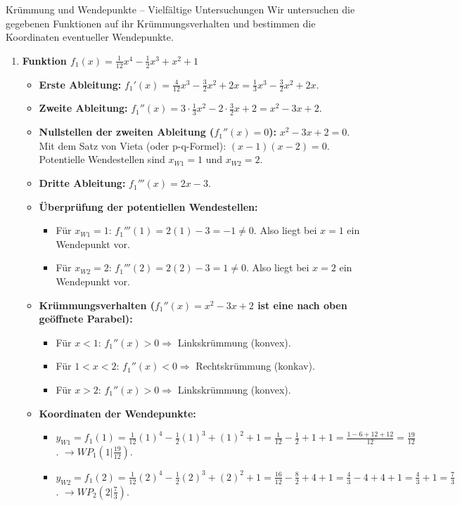 \begin{loesungsumgebung}{Krümmung und Wendepunkte – Vielfältige Untersuchungen}
Wir untersuchen die gegebenen Funktionen auf ihr Krümmungsverhalten und bestimmen die Koordinaten eventueller Wendepunkte.

\begin{enumerate}[label=(\alph*)]
    \item \textbf{Funktion $f_1(x) = \frac{1}{12}x^4 - \frac{1}{2}x^3 + x^2 + 1$}
    \begin{itemize}
        \item \textbf{Erste Ableitung:} $f_1'(x) = \frac{4}{12}x^3 - \frac{3}{2}x^2 + 2x = \frac{1}{3}x^3 - \frac{3}{2}x^2 + 2x$.
        \item \textbf{Zweite Ableitung:} $f_1''(x) = 3 \cdot \frac{1}{3}x^2 - 2 \cdot \frac{3}{2}x + 2 = x^2 - 3x + 2$.
        \item \textbf{Nullstellen der zweiten Ableitung ($f_1''(x)=0$):}
        $x^2 - 3x + 2 = 0$. Mit dem Satz von Vieta (oder p-q-Formel): $(x-1)(x-2)=0$.
        Potentielle Wendestellen sind $x_{W1} = 1$ und $x_{W2} = 2$.
        \item \textbf{Dritte Ableitung:} $f_1'''(x) = 2x - 3$.
        \item \textbf{Überprüfung der potentiellen Wendestellen:}
        \begin{itemize}
            \item Für $x_{W1} = 1$: $f_1'''(1) = 2(1) - 3 = -1 \neq 0$. Also liegt bei $x=1$ ein Wendepunkt vor.
            \item Für $x_{W2} = 2$: $f_1'''(2) = 2(2) - 3 = 1 \neq 0$. Also liegt bei $x=2$ ein Wendepunkt vor.
        \end{itemize}
        \item \textbf{Krümmungsverhalten ($f_1''(x) = x^2 - 3x + 2$ ist eine nach oben geöffnete Parabel):}
        \begin{itemize}
            \item Für $x < 1$: $f_1''(x) > 0 \Rightarrow$ Linkskrümmung (konvex).
            \item Für $1 < x < 2$: $f_1''(x) < 0 \Rightarrow$ Rechtskrümmung (konkav).
            \item Für $x > 2$: $f_1''(x) > 0 \Rightarrow$ Linkskrümmung (konvex).
        \end{itemize}
        \item \textbf{Koordinaten der Wendepunkte:}
        \begin{itemize}
            \item $y_{W1} = f_1(1) = \frac{1}{12}(1)^4 - \frac{1}{2}(1)^3 + (1)^2 + 1 = \frac{1}{12} - \frac{1}{2} + 1 + 1 = \frac{1-6+12+12}{12} = \frac{19}{12}$.
            $\rightarrow WP_1(1|\frac{19}{12})$.
            \item $y_{W2} = f_1(2) = \frac{1}{12}(2)^4 - \frac{1}{2}(2)^3 + (2)^2 + 1 = \frac{16}{12} - \frac{8}{2} + 4 + 1 = \frac{4}{3} - 4 + 4 + 1 = \frac{4}{3} + 1 = \frac{7}{3}$.
            $\rightarrow WP_2(2|\frac{7}{3})$.
        \end{itemize}
    \end{itemize}


\end{enumerate}
\end{loesungsumgebung}

